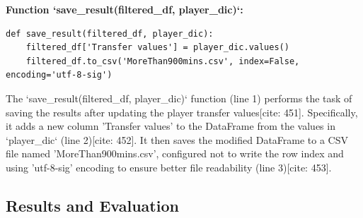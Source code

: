 \documentclass[12pt]{report}
\begin{document}
{{{\textbf{Function `save\_result(filtered\_df, player\_dic)`:}\\
\begin{lstlisting}
def save_result(filtered_df, player_dic):
    filtered_df['Transfer values'] = player_dic.values()
    filtered_df.to_csv('MoreThan900mins.csv', index=False, encoding='utf-8-sig')
\end{lstlisting}
The `save\_result(filtered\_df, player\_dic)` function (line 1) performs the task of saving the results after updating the player transfer values[cite: 451]. Specifically, it adds a new column 'Transfer values' to the DataFrame from the values in `player\_dic` (line 2)[cite: 452]. It then saves the modified DataFrame to a CSV file named 'MoreThan900mins.csv', configured not to write the row index and using 'utf-8-sig' encoding to ensure better file readability (line 3)[cite: 453].
\subsection{Results and Evaluation}
}}}
\end{document}
